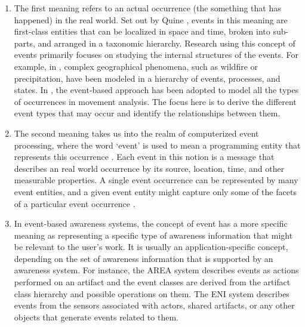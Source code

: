 \begin{enumerate}
   \item The first meaning refers to an actual occurrence (the something that has happened) in the real world. Set out by Quine \cite{quine1985events}, events in this meaning are first-class entities that can be localized in space and time, broken into sub-parts, and arranged in a taxonomic hierarchy. Research using this concept of events primarily focuses on studying the internal structures of the events. For example, in \cite{Yuan2001}, complex geographical phenomena, such as wildfire or precipitation, have been modeled in a hierarchy of events, processes, and states. In \cite{Andrienko2011}, the event-based approach has been adopted to model all the types of occurrences in movement analysis. The focus here is to derive the different event types that may occur and identify the relationships between them.
   \item The second meaning takes us into the realm of computerized event processing, where the word `event' is used to mean a programming entity that represents this occurrence \cite{Spiteri2000}. Each event in this notion is a message that describes an real world occurrence by its source, location, time, and other measurable properties. A single event occurrence can be represented by many event entities, and a given event entity might capture only some of the facets of a particular event occurrence \cite{Etzion2010}.
   \item In event-based awareness systems, the concept of event has a more specific meaning as representing a specific type of awareness information that might be relevant to the user's work. It is usually an application-specific concept, depending on the set of awareness information that is supported by an awareness system. For instance, the AREA system \cite{fuchs1999a} describes events as actions performed on an artifact and the event classes are derived from the artifact class hierarchy and possible operations on them. The ENI system \cite{Gross2004} describes events from the sensors associated with actors, shared artifacts, or any other objects that generate events related to them. 
\end{enumerate}

